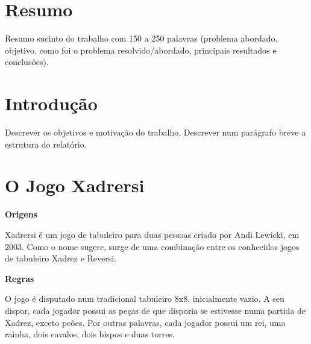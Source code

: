 \documentclass[a4paper]{article}
\begin{document}

\newpage

\section*{Resumo}
Resumo sucinto do trabalho com 150 a 250 palavras (problema abordado, objetivo, como foi o problema resolvido/abordado, principais resultados e conclusões).

\newpage

\tableofcontents



\newpage

\section{Introdução}

Descrever os objetivos e motivação do trabalho. Descrever num parágrafo breve a estrutura do relatório.


\section{O Jogo Xadrersi}

\textbf{Origens}\linebreak

Xadrersi é um jogo de tabuleiro para duas pessoas criado por Andi Lewicki, em 2003. Como o nome sugere, surge de uma combinação entre os conhecidos jogos de tabuleiro Xadrez e Reversi.\newline

\textbf{Regras}\newline

O jogo é disputado num tradicional tabuleiro 8x8, inicialmente vazio. A seu dispor, cada jogador possui as peças de que disporia se estivesse numa partida de Xadrez, exceto peões.
Por outras palavras, cada jogador possui um rei, uma rainha, dois cavalos, dois bispos e duas torres.\newline
\end{document}
